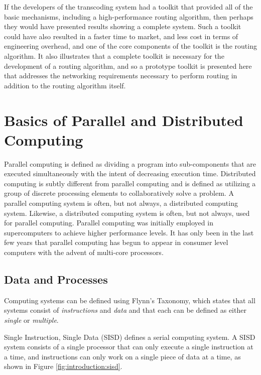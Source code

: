 If the developers of the transcoding system had a toolkit that provided all of the basic mechanisms, including a high-performance routing algorithm, then perhaps they would have presented results showing a complete system. Such a toolkit could have also resulted in a faster time to market, and less cost in terms of engineering overhead, and one of the core components of the toolkit is the routing algorithm. It also illustrates that a complete toolkit is necessary for the development of a routing algorithm, and so a prototype toolkit is presented here that addresses the networking requirements necessary to perform routing in addition to the routing algorithm itself.

\section{Basics of Parallel and Distributed Computing}\label{sec:introduction:parallel_computing_overview}

Parallel computing is defined as dividing a program into sub-components that are executed simultaneously with the intent of decreasing execution time. Distributed computing is subtly different from parallel computing and is defined as utilizing a group of discrete processing elements to collaboratively solve a problem. A parallel computing system is often, but not always, a distributed computing system. Likewise, a distributed computing system is often, but not always, used for parallel computing. Parallel computing was initially employed in supercomputers to achieve higher performance levels. It has only been in the last few years that parallel computing has begun to appear in consumer level computers with the advent of multi-core processors. 

\subsection{Data and Processes}\label{sec:introduction:parallel_computing_overview:data_and_processes}

Computing systems can be defined using Flynn's Taxonomy, which states that all systems consist of \emph{instructions} and \emph{data} and that each can be defined as either \emph{single} or \emph{multiple}. \cite{ref:2009-barney-introduction_to_parallel_computing}

Single Instruction, Single Data (SISD) defines a serial computing system. A SISD system consists of a single processor that can only execute a single instruction at a time, and instructions can only work on a single piece of data at a time, as shown in Figure \ref{fig:introduction:sisd}.

